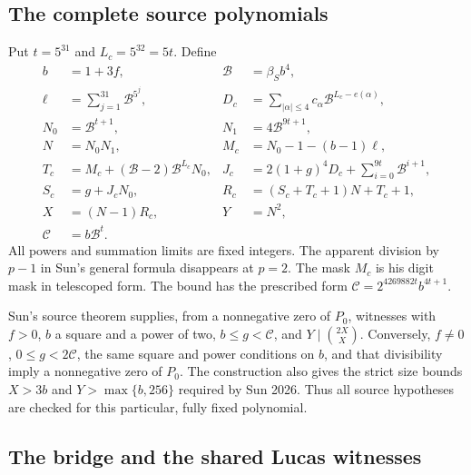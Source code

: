 \subsection{The complete source polynomials}

Put $t=5^{31}$ and $L_c=5^{32}=5t$.  Define
\begin{align*}
 b&=1+3f,&\mathcal B&=\beta_S b^4,\\
 \ell&=\sum_{j=1}^{31}\mathcal B^{5^j},&
 D_c&=\sum_{|\alpha|\le4}c_\alpha\mathcal B^{L_c-e(\alpha)},\\
 N_0&=\mathcal B^{t+1},&N_1&=4\mathcal B^{9t+1},\\
 N&=N_0N_1,&M_c&=N_0-1-(b-1)\ell,\\
 T_c&=M_c+(\mathcal B-2)\mathcal B^{L_c}N_0,&
 J_c&=2(1+g)^4D_c+\sum_{i=0}^{9t}\mathcal B^{i+1},\\
 S_c&=g+J_cN_0,&R_c&=(S_c+T_c+1)N+T_c+1,\\
 X&=(N-1)R_c,&Y&=N^2,\\
 \mathscr C&=b\mathcal B^t.&&
\end{align*}
All powers and summation limits are fixed integers.  The apparent division
by $p-1$ in Sun's general formula disappears at $p=2$.  The mask $M_c$
is his digit mask in telescoped form.  The bound has the prescribed form
$\mathscr C=2^{4269882t}b^{4t+1}$.

Sun's source theorem supplies, from a nonnegative zero of $P_0$, witnesses
with $f>0$, $b$ a square and a power of two, $b\le g<\mathscr C$, and
$Y\mid\binom{2X}{X}$.  Conversely, $f\ne0$, $0\le g<2\mathscr C$, the
same square and power conditions on $b$, and that divisibility imply a
nonnegative zero of $P_0$.  The construction also gives the strict size
bounds $X>3b$ and $Y>\max\{b,256\}$ required by Sun 2026.  Thus all source
hypotheses are checked for this particular, fully fixed polynomial.

\subsection{The bridge and the shared Lucas witnesses}

